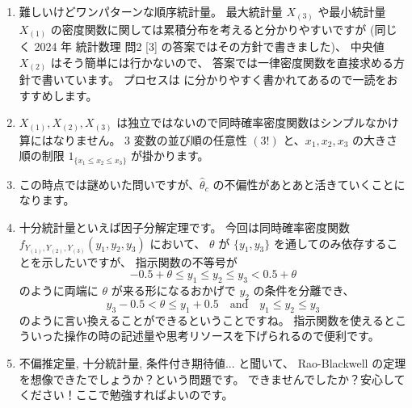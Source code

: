 \documentclass[./main.tex]{subfiles}
\begin{document}
    \begin{enumerate}
        \item 難しいけどワンパターンな順序統計量。
        最大統計量 $X_{(3)}$ や最小統計量 $X_{(1)}$ の密度関数に関しては累積分布を考えると分かりやすいですが
        (同じく 2024 年 統計数理 問2 [3] の答案ではその方針で書きました)、
        中央値 $X_{(2)}$ はそう簡単には行かないので、
        答案では一律密度関数を直接求める方針で書いています。
        プロセスは \cite{kubokawa:2017} に分かりやすく書かれてあるので一読をおすすめします。

        \item $X_{(1)}, X_{(2)}, X_{(3)}$ は独立ではないので同時確率密度関数はシンプルなかけ算にはなりません。
        3 変数の並び順の任意性 $(3!)$ と、$x_1, x_2, x_3$ の大きさ順の制限 $1_{\{ x_1 \leq x_2 \leq x_3 \}}$ が掛かります。

        \item この時点では謎めいた問いですが、$\hat{\theta}_c$ の不偏性があとあと活きていくことになります。
        
        \item 十分統計量といえば因子分解定理です。
        今回は同時確率密度関数 $f_{Y_{(1)}, Y_{(2)}, Y_{(3)}} (y_1, y_2, y_3)$ において、 $\theta$ が
        $\{ y_1, y_3 \}$ を通してのみ依存することを示したいですが、
        指示関数の不等号が
        \begin{equation*}
            - 0.5 + \theta \leq y_1 \leq y_2 \leq y_3 < 0.5 + \theta 
        \end{equation*}
        のように両端に $\theta$ が来る形になるおかげで $y_2$ の条件を分離でき、
        \begin{equation*}
            y_3 - 0.5 < \theta \leq y_1 + 0.5 \quad \text{and} \quad
            y_1 \leq y_2 \leq y_3
        \end{equation*}
        のように言い換えることができるということですね。
        指示関数を使えるとこういった操作の時の記述量や思考リソースを下げられるので便利です。

        \item 不偏推定量, 十分統計量, 条件付き期待値... と聞いて、
        Rao-Blackwell の定理を想像できたでしょうか？という問題です。
        できませんでしたか？安心してください！ここで勉強すればよいのです。


\end{enumerate}
\end{document}
